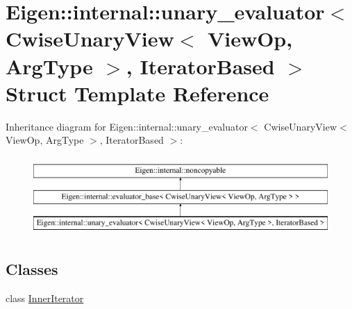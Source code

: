 \hypertarget{struct_eigen_1_1internal_1_1unary__evaluator_3_01_cwise_unary_view_3_01_view_op_00_01_arg_type_01_4_00_01_iterator_based_01_4}{}\section{Eigen\+::internal\+::unary\+\_\+evaluator$<$ Cwise\+Unary\+View$<$ View\+Op, Arg\+Type $>$, Iterator\+Based $>$ Struct Template Reference}
\label{struct_eigen_1_1internal_1_1unary__evaluator_3_01_cwise_unary_view_3_01_view_op_00_01_arg_type_01_4_00_01_iterator_based_01_4}
Inheritance diagram for Eigen\+::internal\+::unary\+\_\+evaluator$<$ Cwise\+Unary\+View$<$ View\+Op, Arg\+Type $>$, Iterator\+Based $>$\+:\begin{figure}[H]
\begin{center}
\leavevmode
\includegraphics[height=3.000000cm]{struct_eigen_1_1internal_1_1unary__evaluator_3_01_cwise_unary_view_3_01_view_op_00_01_arg_type_01_4_00_01_iterator_based_01_4}
\end{center}
\end{figure}
\subsection*{Classes}
\begin{DoxyCompactItemize}
\item 
class \mbox{\hyperlink{class_eigen_1_1internal_1_1unary__evaluator_3_01_cwise_unary_view_3_01_view_op_00_01_arg_type_011a5afe598192a9657664b0cfbd26765b}{Inner\+Iterator}}
\end{DoxyCompactItemize}
